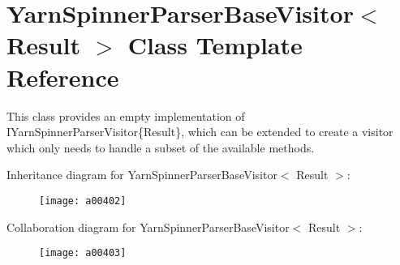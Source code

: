\hypertarget{a00191}{\section{Yarn\-Spinner\-Parser\-Base\-Visitor$<$ Result $>$ Class Template Reference}
\label{a00191}
}


This class provides an empty implementation of I\-Yarn\-Spinner\-Parser\-Visitor\{\-Result\}, which can be extended to create a visitor which only needs to handle a subset of the available methods.  




Inheritance diagram for Yarn\-Spinner\-Parser\-Base\-Visitor$<$ Result $>$\-:
\nopagebreak
\begin{figure}[H]
\begin{center}
\leavevmode
\texttt{[image: a00402]}
\end{center}
\end{figure}


Collaboration diagram for Yarn\-Spinner\-Parser\-Base\-Visitor$<$ Result $>$\-:
\nopagebreak
\begin{figure}[H]
\begin{center}
\leavevmode
\texttt{[image: a00403]}
\end{center}
\end{figure}
